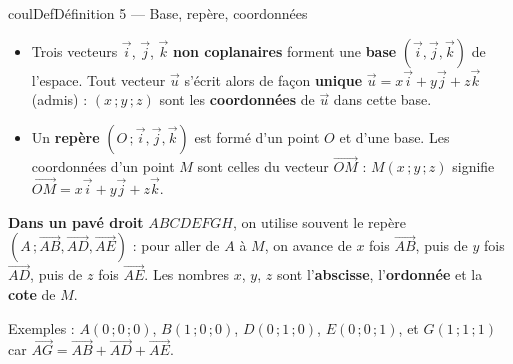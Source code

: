 \documentclass[11pt,a4paper]{article}
\makeatletter
\newcommand{\vect}[1]{\overrightarrow{#1}}
\newcounter{lycee@signet}
\newcommand{\signet}[3][]{\stepcounter{lycee@signet}%
  \edef\lycee@dest{\if\relax\detokenize{#1}\relax
    signet.\arabic{lycee@signet}\else#1\fi}%
  \hypertarget{\lycee@dest}{}\bookmark[level=#2,dest=\lycee@dest]{#3}}
\newenvironment{definitionbox}[1][Définition]%
  {\begin{boitecours}[phantom={\signet{2}{#1}}]{coulDef}{#1}}{\end{boitecours}}
\makeatother
\begin{document}
\begin{definitionbox}[Définition 5 --- Base, repère, coordonnées]
\begin{itemize}
  \item Trois vecteurs $\vect{i}$, $\vect{j}$, $\vect{k}$ \textbf{non coplanaires}
        forment une \textbf{base} $(\vect{i},\vect{j},\vect{k})$ de l'espace. Tout
        vecteur $\vect{u}$ s'écrit alors de façon \textbf{unique}
        $\vect{u}=x\vect{i}+y\vect{j}+z\vect{k}$ (admis) : $(x\,;y\,;z)$ sont les
        \textbf{coordonnées} de $\vect{u}$ dans cette base.
  \item Un \textbf{repère} $(O\,;\vect{i},\vect{j},\vect{k})$ est formé d'un point $O$
        et d'une base. Les coordonnées d'un point $M$ sont celles du vecteur
        $\vect{OM}$ : $M(x\,;y\,;z)$ signifie $\vect{OM}=x\vect{i}+y\vect{j}+z\vect{k}$.
\end{itemize}
\begin{minipage}[c]{0.6\linewidth}\raggedright
\textbf{Dans un pavé droit} $ABCDEFGH$, on utilise souvent le repère
$(A\,;\vect{AB},\vect{AD},\vect{AE})$ : pour aller de $A$ à $M$, on avance de $x$
fois $\vect{AB}$, puis de $y$ fois $\vect{AD}$, puis de $z$ fois $\vect{AE}$. Les
nombres $x$, $y$, $z$ sont l'\textbf{abscisse}, l'\textbf{ordonnée} et la
\textbf{cote} de $M$.

\smallskip
Exemples : $A(0\,;0\,;0)$, $B(1\,;0\,;0)$, $D(0\,;1\,;0)$, $E(0\,;0\,;1)$, et
$G(1\,;1\,;1)$ car $\vect{AG}=\vect{AB}+\vect{AD}+\vect{AE}$.
\end{minipage}\hfill
\begin{minipage}[c]{0.36\linewidth}\centering
{}
\end{minipage}
\end{definitionbox}
\end{document}
